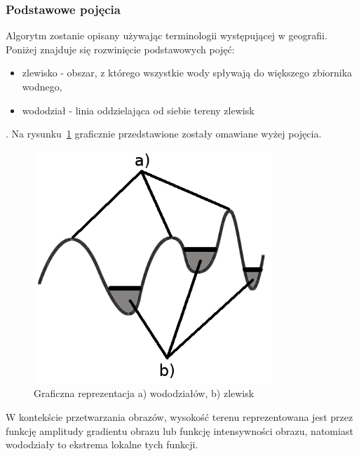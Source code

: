 \subsubsection{Podstawowe pojęcia}
Algorytm zostanie opisany używając terminologii występującej w geografii. Poniżej znajduje się rozwinięcie podstawowych pojęć:
\begin{itemize}
  \item zlewisko - obszar, z którego wszystkie wody spływają do większego zbiornika wodnego,
  \item wododział - linia oddzielająca od siebie tereny zlewisk
\end{itemize}. Na rysunku~\ref{fig:watershed_graphic} graficznie przedstawione zostały omawiane wyżej pojęcia.
\begin{figure}
  \centering
  \includegraphics[width=9cm]{img/watershed-graphic}
  \caption{Graficzna reprezentacja a) wododziałów, b) zlewisk }
  \label{fig:watershed_graphic}
\end{figure}
W kontekście przetwarzania obrazów, wysokość terenu reprezentowana jest przez funkcję amplitudy gradientu obrazu lub funkcję intensywności obrazu, natomiast wododziały to ekstrema lokalne tych funkcji.
